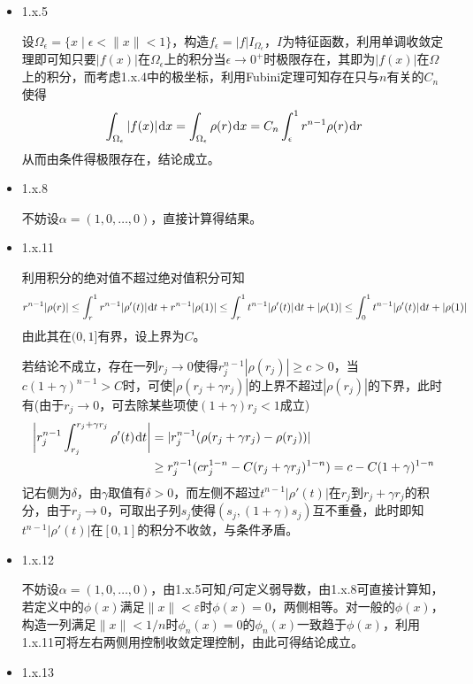 \documentclass[a4paper,UTF8,fontset=windows,10pt]{ctexart}
\newcommand*{\dr}{\hspace{0.07em}\mathrm{d}}
\begin{document}
\begin{enumerate}
\begin{itemize}
        \item 1.x.5
    
        设$\Omega_\epsilon=\{x\mid\epsilon<\|x\|<1\}$，构造$f_\epsilon=|f|I_{\Omega_\epsilon}$，$I$为特征函数，利用单调收敛定理即可知只要$|f(x)|$在$\Omega_\epsilon$上的积分当$\epsilon\to0^+$时极限存在，其即为$|f(x)|$在$\Omega$上的积分，而考虑1.x.4中的极坐标，利用Fubini定理可知存在只与$n$有关的$C_n$使得
        $$\int_{\Omega_\epsilon}|f(x)|\dr x=\int_{\Omega_\epsilon}\rho(r)\dr x=C_n\int_\epsilon^1r^{n-1}\rho(r)\dr r$$
        从而由条件得极限存在，结论成立。
    
        \item 1.x.8
    
        不妨设$\alpha=(1,0,\dots,0)$，直接计算得结果。
    
        \item 1.x.11
        
        利用积分的绝对值不超过绝对值积分可知
        $$r^{n-1}|\rho(r)|\le\int_r^1r^{n-1}|\rho'(t)|\dr t+r^{n-1}|\rho(1)|\le\int_r^1t^{n-1}|\rho'(t)|\dr t+|\rho(1)|\le\int_0^1t^{n-1}|\rho'(t)|\dr t+|\rho(1)|$$
        由此其在$(0,1]$有界，设上界为$C$。
    
        若结论不成立，存在一列$r_j\to0$使得$r_j^{n-1}|\rho(r_j)|\ge c>0$，当$c(1+\gamma)^{n-1}>C$时，可使$|\rho(r_j+\gamma r_j)|$的上界不超过$|\rho(r_j)|$的下界，此时有(由于$r_j\to0$，可去除某些项使$(1+\gamma)r_j<1$成立)
        $$\begin{aligned}\bigg|r_j^{n-1}\int_{r_j}^{r_j+\gamma r_j}\rho'(t)\dr t\bigg|&=|r_j^{n-1}(\rho(r_j+\gamma r_j)-\rho(r_j))|
        \\ &\ge r_j^{n-1}(cr_j^{1-n}-C(r_j+\gamma r_j)^{1-n})=c-C(1+\gamma)^{1-n}\end{aligned}$$
        记右侧为$\delta$，由$\gamma$取值有$\delta>0$，而左侧不超过$t^{n-1}|\rho'(t)|$在$r_j$到$r_j+\gamma r_j$的积分，由于$r_j\to 0$，可取出子列$s_j$使得$(s_j,(1+\gamma)s_j)$互不重叠，此时即知$t^{n-1}|\rho'(t)|$在$[0,1]$的积分不收敛，与条件矛盾。
    
        \item 1.x.12
        
        不妨设$\alpha=(1,0,\dots,0)$，由1.x.5可知$f$可定义弱导数，由1.x.8可直接计算知，若定义中的$\phi(x)$满足$\|x\|<\varepsilon$时$\phi(x)=0$，两侧相等。对一般的$\phi(x)$，构造一列满足$\|x\|<1/n$时$\phi_n(x)=0$的$\phi_n(x)$一致趋于$\phi(x)$，利用1.x.11可将左右两侧用控制收敛定理控制，由此可得结论成立。
    
        \item 1.x.13
        

\end{itemize}
\end{enumerate}
\end{document}
